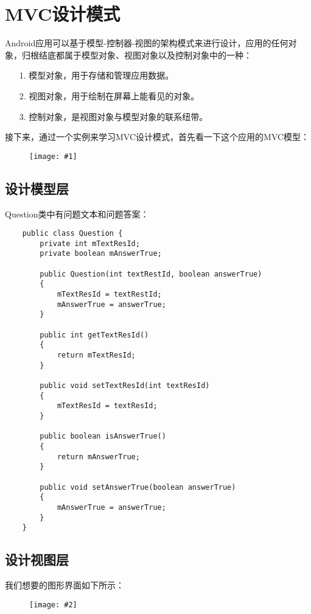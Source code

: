 \documentclass[a4paper,left=2.5cm,right=2.5cm,11pt]{report}
\newcommand{\fic}[1]{\begin{figure}[H]
		\center
		\texttt{[image: \#1]}
	\end{figure}}
\newcommand{\sizedfic}[2]{\begin{figure}[H]
		\center
		\texttt{[image: \#2]}
	\end{figure}}
\begin{document}
\tableofcontents

\clearpage

\section{MVC设计模式}
	Android应用可以基于模型-控制器-视图的架构模式来进行设计，应用的任何对象，归根结底都属于模型对象、视图对象以及控制对象中的一种：
	\begin{itemize}
		\item[1.] 模型对象，用于存储和管理应用数据。
		\item[2.] 视图对象，用于绘制在屏幕上能看见的对象。
		\item[3.] 控制对象，是视图对象与模型对象的联系纽带。
	\end{itemize}

	接下来，通过一个实例来学习MVC设计模式，首先看一下这个应用的MVC模型：
	\fic{1.png}

\subsection{设计模型层}
	Question类中有问题文本和问题答案：
	\begin{lstlisting}
	public class Question {
		private int mTextResId;
		private boolean mAnswerTrue;

		public Question(int textRestId, boolean answerTrue)
		{
			mTextResId = textRestId;
			mAnswerTrue = answerTrue;
		}

		public int getTextResId()
		{
			return mTextResId;
		}

		public void setTextResId(int textResId)
		{
			mTextResId = textResId;
		}

		public boolean isAnswerTrue()
		{
			return mAnswerTrue;
		}

		public void setAnswerTrue(boolean answerTrue)
		{
			mAnswerTrue = answerTrue;
		}
	}
	\end{lstlisting}

\subsection{设计视图层}
	我们想要的图形界面如下所示：
	\sizedfic{0.4}{2.png}
\end{document}
